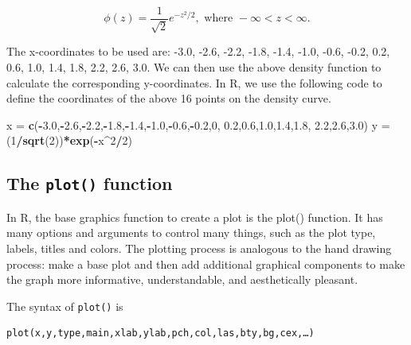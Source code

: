 \documentclass[
]{book}
\newenvironment{Shaded}{\begin{snugshade}}{\end{snugshade}}
\newcommand{\DecValTok}[1]{\textcolor[rgb]{0.00,0.00,0.81}{#1}}
\newcommand{\FloatTok}[1]{\textcolor[rgb]{0.00,0.00,0.81}{#1}}
\newcommand{\FunctionTok}[1]{\textcolor[rgb]{0.13,0.29,0.53}{\textbf{#1}}}
\newcommand{\NormalTok}[1]{#1}
\newcommand{\OtherTok}[1]{\textcolor[rgb]{0.56,0.35,0.01}{#1}}
\newcommand{\SpecialCharTok}[1]{\textcolor[rgb]{0.81,0.36,0.00}{\textbf{#1}}}
\begin{document}
\[
\phi(z) = \frac{1}{\sqrt{2}}e^{-z^2/2}, \mbox{ where } -\infty < z <\infty.
\]

The x-coordinates to be used are: -3.0, -2.6, -2.2, -1.8, -1.4, -1.0, -0.6, -0.2, 0.2, 0.6, 1.0, 1.4, 1.8, 2.2, 2.6, 3.0. We can then use the above density function to calculate the corresponding y-coordinates. In R, we use the following code to define the coordinates of the above 16 points on the density curve.

\begin{Shaded}
\begin{Highlighting}[]
\NormalTok{x }\OtherTok{=} \FunctionTok{c}\NormalTok{(}\SpecialCharTok{{-}}\FloatTok{3.0}\NormalTok{,}\SpecialCharTok{{-}}\FloatTok{2.6}\NormalTok{,}\SpecialCharTok{{-}}\FloatTok{2.2}\NormalTok{,}\SpecialCharTok{{-}}\FloatTok{1.8}\NormalTok{,}\SpecialCharTok{{-}}\FloatTok{1.4}\NormalTok{,}\SpecialCharTok{{-}}\FloatTok{1.0}\NormalTok{,}\SpecialCharTok{{-}}\FloatTok{0.6}\NormalTok{,}\SpecialCharTok{{-}}\FloatTok{0.2}\NormalTok{,}\DecValTok{0}\NormalTok{, }\FloatTok{0.2}\NormalTok{,}\FloatTok{0.6}\NormalTok{,}\FloatTok{1.0}\NormalTok{,}\FloatTok{1.4}\NormalTok{,}\FloatTok{1.8}\NormalTok{, }\FloatTok{2.2}\NormalTok{,}\FloatTok{2.6}\NormalTok{,}\FloatTok{3.0}\NormalTok{)}
\NormalTok{y }\OtherTok{=}\NormalTok{ (}\DecValTok{1}\SpecialCharTok{/}\FunctionTok{sqrt}\NormalTok{(}\DecValTok{2}\NormalTok{))}\SpecialCharTok{*}\FunctionTok{exp}\NormalTok{(}\SpecialCharTok{{-}}\NormalTok{x}\SpecialCharTok{\^{}}\DecValTok{2}\SpecialCharTok{/}\DecValTok{2}\NormalTok{)}
\end{Highlighting}
\end{Shaded}

\hypertarget{the-plot-function}{%
\subsection{\texorpdfstring{The \texttt{plot()} function}{The plot() function}}\label{the-plot-function}}

In R, the base graphics function to create a plot is the plot() function. It has many options and arguments to control many things, such as the plot type, labels, titles and colors. The plotting process is analogous to the hand drawing process: make a base plot and then add additional graphical components to make the graph more informative, understandable, and aesthetically pleasant.

The syntax of \texttt{plot()} is

\begin{verbatim}
plot(x,y,type,main,xlab,ylab,pch,col,las,bty,bg,cex,…)
\end{verbatim}
\end{document}
